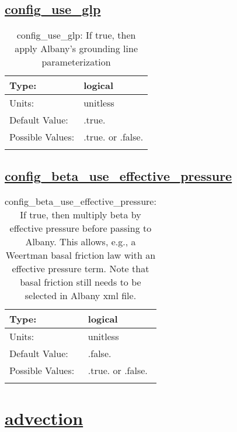 \subsection[config\_use\_glp]{\hyperref[sec:nm_tab_velocity_solver]{config\_use\_glp}}
\label{subsec:nm_sec_config_use_glp}
\begin{center}
\begin{longtable}{| p{2.0in} || p{4.0in} |}
    \hline
    Type: & logical \\
    \hline
    Units: & \si{unitless} \\
    \hline
    Default Value: & .true. \\
    \hline
    Possible Values: & .true. or .false. \\
    \hline
    \caption{config\_use\_glp: If true, then apply Albany's grounding line parameterization}
\end{longtable}
\end{center}
\subsection[config\_beta\_use\_effective\_pressure]{\hyperref[sec:nm_tab_velocity_solver]{config\_beta\_use\_effective\_pressure}}
\label{subsec:nm_sec_config_beta_use_effective_pressure}
\begin{center}
\begin{longtable}{| p{2.0in} || p{4.0in} |}
    \hline
    Type: & logical \\
    \hline
    Units: & \si{unitless} \\
    \hline
    Default Value: & .false. \\
    \hline
    Possible Values: & .true. or .false. \\
    \hline
    \caption{config\_beta\_use\_effective\_pressure: If true, then multiply beta by effective pressure before passing to Albany.  This allows, e.g., a Weertman basal friction law with an effective pressure term.  Note that basal friction still needs to be selected in Albany xml file.}
\end{longtable}
\end{center}
\section[advection]{\hyperref[sec:nm_tab_advection]{advection}}
\label{sec:nm_sec_advection}
